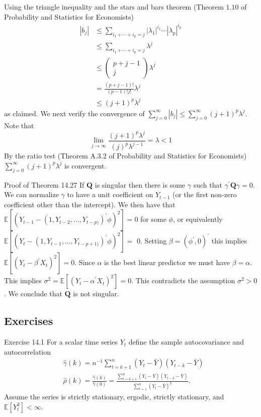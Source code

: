 \documentclass[10pt]{article}
\begin{document}
Using the triangle inequality and the stars and bars theorem (Theorem $1.10$ of Probability and Statistics for Economists)
$$
\begin{aligned}
\left|b_{j}\right| & \leq \sum_{i_{1}+\cdots+i_{p}=j}\left|\lambda_{1}\right|^{i_{1}} \cdots\left|\lambda_{p}\right|^{i_{p}} \\
& \leq \sum_{i_{1}+\cdots+i_{p}=j} \lambda^{j} \\
& \leq\left(\begin{array}{c}
p+j-1 \\
j
\end{array}\right) \lambda^{j} \\
&=\frac{(p+j-1) !}{(p-1) ! j !} \lambda^{j} \\
& \leq(j+1)^{p} \lambda^{j}
\end{aligned}
$$
as claimed. We next verify the convergence of $\sum_{j=0}^{\infty}\left|b_{j}\right| \leq \sum_{j=0}^{\infty}(j+1)^{p} \lambda^{j}$. Note that
$$
\lim _{j \rightarrow \infty} \frac{(j+1)^{p} \lambda^{j}}{(j)^{p} \lambda^{j-1}}=\lambda<1
$$
By the ratio test (Theorem A.3.2 of Probability and Statistics for Economists) $\sum_{j=0}^{\infty}(j+1)^{p} \lambda^{j}$ is convergent.

Proof of Theorem 14.27 If $\boldsymbol{Q}$ is singular then there is some $\gamma$ such that $\gamma^{\prime} \boldsymbol{Q} \gamma=0$. We can normalize $\gamma$ to have a unit coefficient on $Y_{t-1}$ (or the first non-zero coefficient other than the intercept). We then have that $\mathbb{E}\left[\left(Y_{t-1}-\left(1, Y_{t-2}, \ldots, Y_{t-p)}\right)^{\prime} \phi\right)^{2}\right]=0$ for some $\phi$, or equivalently $\mathbb{E}\left[\left(Y_{t}-\left(1, Y_{t-1}, \ldots, Y_{t-p+1)}\right)^{\prime} \phi\right)^{2}\right]=$ 0. Setting $\beta=\left(\phi^{\prime}, 0\right)^{\prime}$ this implies $\mathbb{E}\left[\left(Y_{t}-\beta^{\prime} X_{t}\right)^{2}\right]=0$. Since $\alpha$ is the best linear predictor we must have $\beta=\alpha$. This implies $\sigma^{2}=\mathbb{E}\left[\left(Y_{t}-\alpha^{\prime} X_{t}\right)^{2}\right]=0$. This contradicts the assumption $\sigma^{2}>0$. We conclude that $\boldsymbol{Q}$ is not singular.

\subsection{Exercises}
Exercise 14.1 For a scalar time series $Y_{t}$ define the sample autocovariance and autocorrelation
$$
\begin{aligned}
&\widehat{\gamma}(k)=n^{-1} \sum_{t=k+1}^{n}\left(Y_{t}-\bar{Y}\right)\left(Y_{t-k}-\bar{Y}\right) \\
&\widehat{\rho}(k)=\frac{\widehat{\gamma}(k)}{\widehat{\gamma}(0)}=\frac{\sum_{t=k+1}^{n}\left(Y_{t}-\bar{Y}\right)\left(Y_{t-k}-\bar{Y}\right)}{\sum_{t=1}^{n}\left(Y_{t}-\bar{Y}\right)^{2}} .
\end{aligned}
$$
Assume the series is strictly stationary, ergodic, strictly stationary, and $\mathbb{E}\left[Y_{t}^{2}\right]<\infty$.
\end{document}
